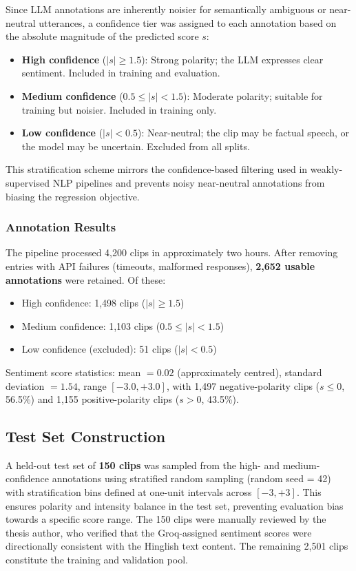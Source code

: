 Since LLM annotations are inherently noisier for semantically ambiguous or near-neutral utterances, a confidence tier was assigned to each annotation based on the absolute magnitude of the predicted score $s$:
\begin{itemize}
    \item \textbf{High confidence} ($|s| \geq 1.5$): Strong polarity; the LLM expresses clear sentiment. Included in training and evaluation.
    \item \textbf{Medium confidence} ($0.5 \leq |s| < 1.5$): Moderate polarity; suitable for training but noisier. Included in training only.
    \item \textbf{Low confidence} ($|s| < 0.5$): Near-neutral; the clip may be factual speech, or the model may be uncertain. Excluded from all splits.
\end{itemize}

This stratification scheme mirrors the confidence-based filtering used in weakly-supervised NLP pipelines \cite{brown2020gpt3} and prevents noisy near-neutral annotations from biasing the regression objective.

\subsubsection{Annotation Results}

The pipeline processed 4,200 clips in approximately two hours. After removing entries with API failures (timeouts, malformed responses), \textbf{2,652 usable annotations} were retained. Of these:

\begin{itemize}
    \item High confidence: 1,498 clips ($|s| \geq 1.5$)
    \item Medium confidence: 1,103 clips ($0.5 \leq |s| < 1.5$)
    \item Low confidence (excluded): 51 clips ($|s| < 0.5$)
\end{itemize}

Sentiment score statistics: mean $= 0.02$ (approximately centred), standard deviation $= 1.54$, range $[-3.0, +3.0]$, with 1,497 negative-polarity clips ($s \leq 0$, 56.5\%) and 1,155 positive-polarity clips ($s > 0$, 43.5\%).

\subsection{Test Set Construction}

A held-out test set of \textbf{150 clips} was sampled from the high- and medium-confidence annotations using stratified random sampling (random seed = 42) with stratification bins defined at one-unit intervals across $[-3, +3]$. This ensures polarity and intensity balance in the test set, preventing evaluation bias towards a specific score range. The 150 clips were manually reviewed by the thesis author, who verified that the Groq-assigned sentiment scores were directionally consistent with the Hinglish text content. The remaining 2,501 clips constitute the training and validation pool.

